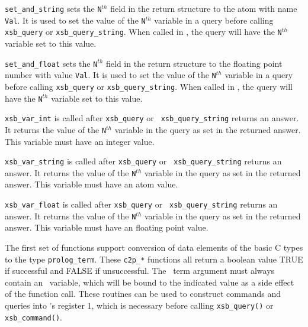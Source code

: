 {\begin{description}
    {\tt set\_and\_string} sets the {\tt N}$^{th}$ field in the return
structure to the atom with name {\tt Val}.  It is used to set the
value of the {\tt N}$^{th}$ variable in a query before calling {\tt
xsb\_query} or {\tt xsb\_query\_string}.  When called in \ourprolog,
the query will have the {\tt N}$^{th}$ variable set to this value.

    {\tt set\_and\_float} sets the {\tt N}$^{th}$ field in the return
structure to the floating point number with value {\tt Val}.  It is
used to set the value of the {\tt N}$^{th}$ variable in a query before
calling {\tt xsb\_query} or {\tt xsb\_query\_string}.  When called in
\ourprolog, the query will have the {\tt N}$^{th}$ variable set to this
value.

 
    {\tt xsb\_var\_int} is called after {\tt xsb\_query} or {\tt
xsb\_query\_string} returns an answer.  It returns the value of the
{\tt N}$^{th}$ variable in the query as set in the returned answer.
This variable must have an integer value.

 
    {\tt xsb\_var\_string} is called after {\tt xsb\_query} or {\tt
xsb\_query\_string} returns an answer.  It returns the value of the
{\tt N}$^{th}$ variable in the query as set in the returned answer.
This variable must have an atom value.

 
    {\tt xsb\_var\_float} is called after {\tt xsb\_query} or {\tt
xsb\_query\_string} returns an answer.  It returns the value of the
{\tt N}$^{th}$ variable in the query as set in the returned answer.
This variable must have an floating point value.


\end{description}


The first set of functions support conversion of data elements of the
basic C types to the type {\tt prolog\_term}.  These {\tt c2p\_*}
functions all return a boolean value TRUE if successful and FALSE if
unsuccessful.  The \ourprolog\ term argument must always contain an
\ourprolog\ variable, which will be bound to the indicated value as a
side effect of the function call.  These routines can be used to
construct commands and queries into \ourprolog 's register 1, which is
necessary before calling {\tt xsb\_query()} or {\tt xsb\_command()}.

}
